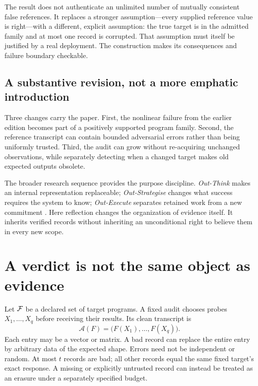 \documentclass[11pt,letterpaper]{article}
\theoremstyle{remark}\newtheorem{remark}{Remark}[section]
\begin{document}
The result does not authenticate an unlimited number of mutually consistent false references. It replaces a stronger assumption---every supplied reference value is right---with a different, explicit assumption: the true target is in the admitted family and at most one record is corrupted. That assumption must itself be justified by a real deployment. The construction makes its consequences and failure boundary checkable.

\subsection{A substantive revision, not a more emphatic introduction}
Three changes carry the paper. First, the nonlinear failure from the earlier edition becomes part of a positively supported program family. Second, the reference transcript can contain bounded adversarial errors rather than being uniformly trusted. Third, the audit can grow without re-acquiring unchanged observations, while separately detecting when a changed target makes old expected outputs obsolete.

The broader research sequence provides the purpose discipline. \emph{Out-Think} makes an internal representation replaceable; \emph{Out-Strategise} changes what success requires the system to know; \emph{Out-Execute} separates retained work from a new commitment \citep{think,strategy,execute}. Here reflection changes the organization of evidence itself. It inherits verified records without inheriting an unconditional right to believe them in every new scope.

\section{A verdict is not the same object as evidence}
\label{sec:distance}
Let $\mathcal F$ be a declared set of target programs. A fixed audit chooses probes $X_1,\ldots,X_q$ before receiving their results. Its clean transcript is
\begin{equation}
 \mathcal A(F)=\bigl(F(X_1),\ldots,F(X_q)\bigr).
\end{equation}
Each entry may be a vector or matrix. A bad record can replace the entire entry by arbitrary data of the expected shape. Errors need not be independent or random. At most $t$ records are bad; all other records equal the same fixed target's exact response. A missing or explicitly untrusted record can instead be treated as an erasure under a separately specified budget.
\end{document}
